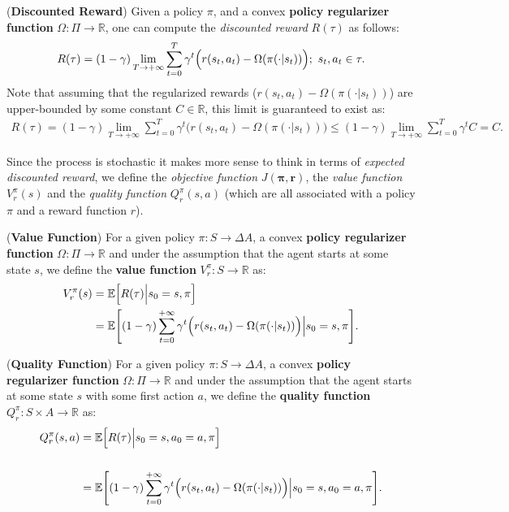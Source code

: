 \begin{definition}
    (\textbf{Discounted Reward})
    Given a policy $\pi$, and a convex \textbf{policy regularizer function} $\Omega: \Pi \rightarrow \mathbb{R}$, one can compute the \textit{discounted reward} $R(\tau)$ as follows:
    \begin{align*}
        R(\tau) = (1-\gamma) \lim_{T \rightarrow + \infty}\sum_{t=0}^{T} \gamma^t \Bigl( r(s_t,a_t) - \Omega(\pi(\cdot|s_t)) \Bigr) ;~ s_t,a_t \in \tau.
    \end{align*}
    Note that assuming that the regularized rewards ($r(s_t,a_t)- \Omega(\pi(\cdot|s_t))$) are upper-bounded by some constant $C\in \mathbb{R}$, this limit is guaranteed to exist as:
    \begin{align*}
        R(\tau) = (1-\gamma) \lim_{T \rightarrow + \infty}\sum_{t=0}^{T} \gamma^t \Big(r(s_t,a_t)- \Omega(\pi(\cdot|s_t))\Big) \leq (1-\gamma) \lim_{T \rightarrow + \infty}\sum_{t=0}^{T} \gamma^t C = C.
    \end{align*}
\end{definition}
\noindent
Since the process is stochastic it makes more sense to think in terms of \textit{expected discounted reward}, we define the \textit{objective function} $J(\bm{\pi},\bm{r})$, the \textit{value function} $V^\pi_r(s)$ and the \textit{quality function} $Q^\pi_r(s,a)$ (which are all associated with a policy $\pi$ and a reward function $r$).

\begin{definition}
    (\textbf{Value Function})
    For a given policy $\pi:S\rightarrow \Delta A$, a convex \textbf{policy regularizer function} $\Omega: \Pi \rightarrow \mathbb{R}$ and under the assumption that the agent starts at some state $s$, we define the \textbf{value function} $V^\pi_r:S\rightarrow \mathbb{R}$ as:
    \begin{align*}
        V_r^\pi(s) &= \mathbb{E}\Big[ R(\tau) \Big| s_0  = s, \pi \Big] \\
         &= \mathbb{E}\Bigg[ (1-\gamma) \sum_{t=0}^{+\infty} \gamma^t \Bigl(  r(s_t,a_t) - \Omega(\pi(\cdot|s_t))  \Bigr) \Big| s_0  = s, \pi \Bigg].
    \end{align*}
\end{definition}

\begin{definition}
    (\textbf{Quality Function})
    For a given policy $\pi:S\rightarrow \Delta A$, a convex \textbf{policy regularizer function} $\Omega: \Pi \rightarrow \mathbb{R}$ and under the assumption that the agent starts at some state $s$ with some first action $a$, we define the \textbf{quality function} $Q_r^\pi:S\times A \rightarrow \mathbb{R}$ as:
    \begin{align*}
        Q_r^\pi(s,a) &= \mathbb{E}\Big[ R(\tau) \Big| s_0  = s, a_0  = a, \pi \Big] \\
        \\ &= \mathbb{E}\Bigg[ (1-\gamma) \sum_{t=0}^{+\infty} \gamma^t \Bigl( r(s_t,a_t) - \Omega(\pi(\cdot|s_t))  \Bigr)  \Big| s_0  = s, a_0 = a, \pi \Bigg].
    \end{align*}
\end{definition}

